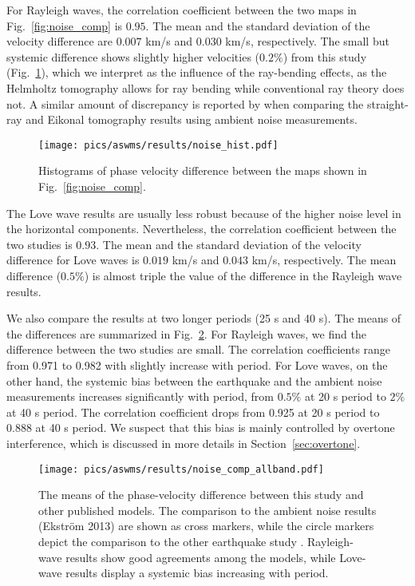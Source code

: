 For Rayleigh waves, the correlation coefficient between the two maps in Fig.~\ref{fig:noise_comp} is $0.95$. The mean and the standard deviation of the velocity difference are $0.007$ km/s and $0.030$ km/s, respectively. 
The small but systemic difference shows slightly higher velocities ($0.2\%$) from this study (Fig.~\ref{fig:noise_hist}), which we interpret as the influence of the ray-bending effects, as the Helmholtz tomography allows for ray bending while conventional ray theory does not. A similar amount of discrepancy is reported by \citet{Lin:2009fx} when comparing the straight-ray and Eikonal tomography results using ambient noise measurements.

\begin{figure}
\center
	\texttt{[image: pics/aswms/results/noise\_hist.pdf]}
	\caption{Histograms of phase velocity difference between the maps shown in Fig.~\ref{fig:noise_comp}.}
	\label{fig:noise_hist}
\end{figure}

The Love wave results are usually less robust because of the higher noise level in the horizontal components. Nevertheless, the correlation coefficient between the two studies is $0.93$. The mean and the standard deviation of the velocity difference for Love waves is $0.019$ km/s and $0.043$ km/s, respectively. The mean difference ($0.5\%$) is almost triple the value of the difference in the Rayleigh wave results. 

We also compare the results at two longer periods (25 s and 40 s). The means of the differences are summarized in Fig.~\ref{fig:noise_comp_allband}. For Rayleigh waves, we find the difference between the two studies are small. The correlation coefficients range from 0.971 to 0.982 with slightly increase with period. For Love waves, on the other hand, the systemic bias between the earthquake and the ambient noise measurements increases significantly with period, from $0.5 \%$ at 20 s period to $2 \%$ at 40 s period. The correlation coefficient drops from 0.925 at 20 s period to 0.888 at 40 s period. We suspect that this bias is mainly controlled by overtone interference, which is discussed in more details in Section~\ref{sec:overtone}.

\begin{figure}
	\center
	\texttt{[image: pics/aswms/results/noise\_comp\_allband.pdf]}
	\caption{The means of the phase-velocity difference between this study and other published models. The comparison to the ambient noise results (Ekstr\"{o}m 2013) are shown as cross markers, while the circle markers depict the comparison to the other earthquake study \citep{foster:2014kna}. Rayleigh-wave results show good agreements among the models, while Love-wave results display a systemic bias increasing with period.}
	\label{fig:noise_comp_allband}
\end{figure}

